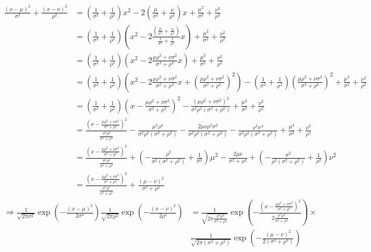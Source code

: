 \documentclass{article}
\begin{document}
\begin{pf}
\begin{align*}
\frac{(x-\mu)^2}{\sigma^2}+\frac{(x-\nu)^2}{\rho^2}&=\left(\frac{1}{\sigma^2}+\frac{1}{\rho^2}\right)x^2-2\left(\frac{\mu}{\sigma^2}+\frac{\nu}{\rho^2}\right)x+\frac{\mu^2}{\sigma^2}+\frac{\nu^2}{\rho^2}
\\&=\left(\frac{1}{\sigma^2}+\frac{1}{\rho^2}\right)\left(x^2-2\frac{\left(\frac{\mu}{\sigma^2}+\frac{\nu}{\rho^2}\right)}{\frac{1}{\sigma^2}+\frac{1}{\rho^2}}x\right)+\frac{\mu^2}{\sigma^2}+\frac{\nu^2}{\rho^2}
\\&=\left(\frac{1}{\sigma^2}+\frac{1}{\rho^2}\right)\left(x^2-2\frac{\mu\rho^2+\nu\sigma^2}{\sigma^2+\rho^2}x\right)+\frac{\mu^2}{\sigma^2}+\frac{\nu^2}{\rho^2}
\\&=\left(\frac{1}{\sigma^2}+\frac{1}{\rho^2}\right)\left(x^2-2\frac{\mu\rho^2+\nu\sigma^2}{\sigma^2+\rho^2}x+\left(\frac{\mu\rho^2+\nu\sigma^2}{\sigma^2+\rho^2}\right)^2\right)-\left(\frac{1}{\sigma^2}+\frac{1}{\rho^2}\right)\left(\frac{\mu\rho^2+\nu\sigma^2}{\sigma^2+\rho^2}\right)^2+\frac{\mu^2}{\sigma^2}+\frac{\nu^2}{\rho^2}
\\&=\left(\frac{1}{\sigma^2}+\frac{1}{\rho^2}\right)\left(x-\frac{\mu\rho^2+\nu\sigma^2}{\sigma^2+\rho^2}\right)^2-\frac{(\mu\rho^2+\nu\sigma^2)^2}{\sigma^2\rho^2(\sigma^2+\rho^2)}+\frac{\mu^2}{\sigma^2}+\frac{\nu^2}{\rho^2}
\\&=\frac{\left(x-\frac{\mu\rho^2+\nu\sigma^2}{\sigma^2+\rho^2}\right)^2}{\frac{\sigma^2\rho^2}{\sigma^2+\rho^2}}-\frac{\mu^2\rho^4}{\sigma^2\rho^2(\sigma^2+\rho^2)}-\frac{2\mu\nu\rho^2\sigma^2}{\sigma^2\rho^2(\sigma^2+\rho^2)}-\frac{\nu^2\sigma^4}{\sigma^2\rho^2(\sigma^2+\rho^2)}+\frac{\mu^2}{\sigma^2}+\frac{\nu^2}{\rho^2}
\\&=\frac{\left(x-\frac{\mu\rho^2+\nu\sigma^2}{\sigma^2+\rho^2}\right)^2}{\frac{\sigma^2\rho^2}{\sigma^2+\rho^2}}+\left(-\frac{\rho^2}{\sigma^2(\sigma^2+\rho^2)}+\frac{1}{\sigma^2}\right)\mu^2-\frac{2\mu\nu}{\sigma^2+\rho^2}+\left(-\frac{\sigma^2}{\rho^2(\sigma^2+\rho^2)}+\frac{1}{\rho^2}\right)\nu^2
\\&=\frac{\left(x-\frac{\mu\rho^2+\nu\sigma^2}{\sigma^2+\rho^2}\right)^2}{\frac{\sigma^2\rho^2}{\sigma^2+\rho^2}}+\frac{(\mu-\nu)^2}{\sigma^2+\rho^2}
\end{align*}
\begin{align*}
\Rightarrow \frac{1}{\sqrt{2\pi\sigma^2}}\exp\left(-\frac{(x-\mu)^2}{2\sigma^2}\right)\frac{1}{\sqrt{2\pi\rho^2}}\exp\left(-\frac{(x-\nu)^2}{2\rho^2}\right)&=\frac{1}{\sqrt{2\pi\frac{\sigma^2\rho^2}{\sigma^2+\rho^2}}}\exp\left(-\frac{\left(x-\frac{\mu\rho^2+\nu\sigma^2}{\sigma^2+\rho^2}\right)^2}{2\frac{\sigma^2\rho^2}{\sigma^2+\rho^2}}\right)\times
\\&\frac{1}{\sqrt{2\pi(\sigma^2+\rho^2)}}\exp\left(-\frac{(\mu-\nu)^2}{2(\sigma^2+\rho^2)}\right)
\end{align*}
\end{pf}
\end{document}
